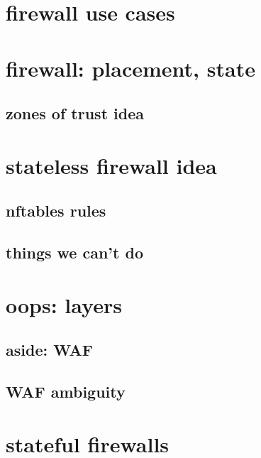 \section{firewall use cases}



\section{firewall: placement, state}


\subsection{zones of trust idea}


\section{stateless firewall idea}


\subsection{nftables rules}


\subsection{things we can't do}


\section{oops: layers}


\subsection{aside: WAF}


\subsection{WAF ambiguity}


\section{stateful firewalls}


